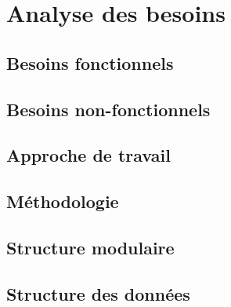 \chapter{Analyse des besoins}
        \section{Besoins fonctionnels}
                \lipsum[1]
        \section{Besoins non-fonctionnels}
                \lipsum[1]
        \section{Approche de travail}
                \lipsum[1]
        \section{Méthodologie}
                \lipsum[1]
        \section{Structure modulaire}
                \lipsum[1]
        \section{Structure des données}
                \lipsum[1]